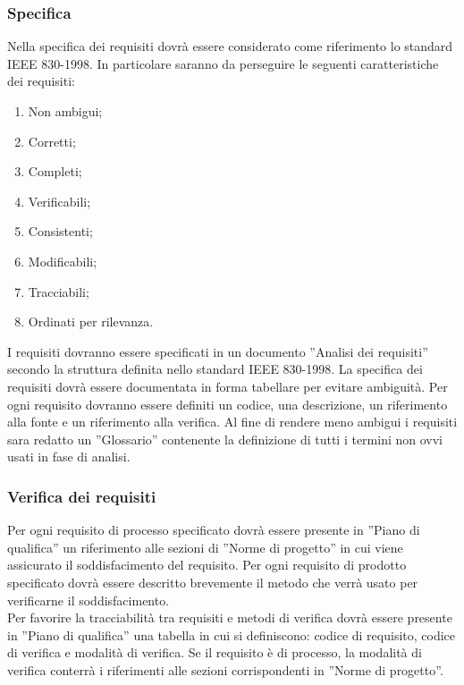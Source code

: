 {			\subsubsection{Specifica}{
				Nella specifica dei requisiti dovrà essere considerato come riferimento lo standard IEEE 830-1998. In particolare saranno da perseguire le seguenti caratteristiche dei requisiti:
				\begin{enumerate}
					\item Non ambigui;
					\item Corretti;
					\item Completi;
					\item Verificabili;
					\item Consistenti;
					\item Modificabili;
					\item Tracciabili;
					\item Ordinati per rilevanza.
				\end{enumerate}
				I requisiti dovranno essere specificati in un documento ”Analisi dei requisiti” secondo la struttura definita nello standard IEEE 830-1998. La specifica dei requisiti dovrà essere documentata in forma tabellare per evitare ambiguità. Per ogni requisito dovranno essere definiti un codice, una descrizione, un riferimento alla fonte e un riferimento alla verifica. Al fine di rendere meno ambigui i requisiti sara redatto un ”Glossario” contenente la definizione di tutti i termini non ovvi usati in fase di analisi.
			}
			\subsubsection{Verifica dei requisiti}{
				Per ogni requisito\ped{g} di processo specificato dovrà essere presente in ”Piano di qualifica” un riferimento alle sezioni di ”Norme di progetto” in cui viene assicurato il soddisfacimento del requisito. Per ogni requisito di prodotto specificato dovrà essere descritto brevemente il metodo che verrà usato per verificarne il soddisfacimento.\\Per favorire la tracciabilità tra requisiti e metodi di verifica dovrà essere presente in ”Piano di qualifica” una tabella in cui si definiscono: codice\ped{g} di requisito, codice di verifica e modalità di verifica. Se il requisito\ped{g} è di processo, la modalità di verifica conterrà i riferimenti alle sezioni corrispondenti in ”Norme di progetto”.
			}
		}
